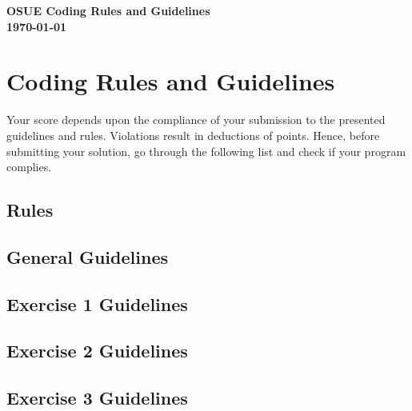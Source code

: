 \documentclass[11pt,a4paper,oneside]{article}
\begin{document}
\begin{center}
  {\huge \bf OSUE Coding Rules and Guidelines} \\
  \vspace{0.5em}
  {\large \bf \today}
\end{center}

\section*{Coding Rules and Guidelines}
Your score depends upon the compliance of your submission to the presented
guidelines and rules. Violations result in deductions of points.
Hence, before submitting your solution, go through the following list
and check if your program complies.

\subsection*{Rules}

\subsection*{General Guidelines}

\subsection*{Exercise 1 Guidelines}

\subsection*{Exercise 2 Guidelines}

\subsection*{Exercise 3 Guidelines}

\end{document}
